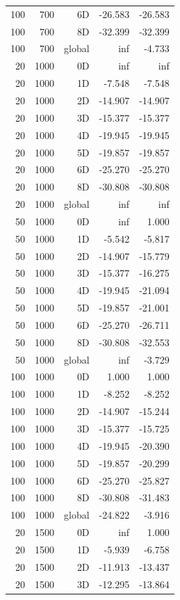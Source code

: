 \begin{longtable}{rrrrr}
100 & 700 & 6D & -26.583 & -26.583 \\
100 & 700 & 8D & -32.399 & -32.399 \\
100 & 700 & global & inf & -4.733 \\
20 & 1000 & 0D & inf & inf \\
20 & 1000 & 1D & -7.548 & -7.548 \\
20 & 1000 & 2D & -14.907 & -14.907 \\
20 & 1000 & 3D & -15.377 & -15.377 \\
20 & 1000 & 4D & -19.945 & -19.945 \\
20 & 1000 & 5D & -19.857 & -19.857 \\
20 & 1000 & 6D & -25.270 & -25.270 \\
20 & 1000 & 8D & -30.808 & -30.808 \\
20 & 1000 & global & inf & inf \\
50 & 1000 & 0D & inf & 1.000 \\
50 & 1000 & 1D & -5.542 & -5.817 \\
50 & 1000 & 2D & -14.907 & -15.779 \\
50 & 1000 & 3D & -15.377 & -16.275 \\
50 & 1000 & 4D & -19.945 & -21.094 \\
50 & 1000 & 5D & -19.857 & -21.001 \\
50 & 1000 & 6D & -25.270 & -26.711 \\
50 & 1000 & 8D & -30.808 & -32.553 \\
50 & 1000 & global & inf & -3.729 \\
100 & 1000 & 0D & 1.000 & 1.000 \\
100 & 1000 & 1D & -8.252 & -8.252 \\
100 & 1000 & 2D & -14.907 & -15.244 \\
100 & 1000 & 3D & -15.377 & -15.725 \\
100 & 1000 & 4D & -19.945 & -20.390 \\
100 & 1000 & 5D & -19.857 & -20.299 \\
100 & 1000 & 6D & -25.270 & -25.827 \\
100 & 1000 & 8D & -30.808 & -31.483 \\
100 & 1000 & global & -24.822 & -3.916 \\
20 & 1500 & 0D & inf & 1.000 \\
20 & 1500 & 1D & -5.939 & -6.758 \\
20 & 1500 & 2D & -11.913 & -13.437 \\
20 & 1500 & 3D & -12.295 & -13.864 \\

\end{longtable}
